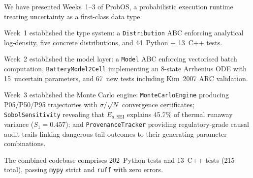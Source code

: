 \documentclass[12pt,a4paper]{article}
\theoremstyle{plain}
\theoremstyle{definition}
\theoremstyle{remark}
\begin{document}
We have presented Weeks~1--3 of ProbOS, a probabilistic execution
runtime treating uncertainty as a first-class data type.

Week~1 established the type system: a \texttt{Distribution} ABC
enforcing analytical log-density, five concrete distributions, and
44~Python + 13~C++ tests.

Week~2 established the model layer: a \texttt{Model} ABC enforcing
vectorised batch computation, \texttt{BatteryModel2Cell} implementing
an 8-state Arrhenius ODE with 15~uncertain parameters, and 67~new tests
including Kim~2007 ARC validation.

Week~3 established the Monte Carlo engine: \texttt{MonteCarloEngine}
producing P05/P50/P95 trajectories with $\sigma/\sqrt{N}$ convergence
certificates; \texttt{SobolSensitivity} revealing that $E_{a,\text{SEI}}$
explains 45.7\% of thermal runaway variance ($S_1 = 0.457$);
and \texttt{ProvenanceTracker} providing regulatory-grade causal
audit trails linking dangerous tail outcomes to their generating
parameter combinations.

The combined codebase comprises 202~Python tests and 13~C++ tests (215 total),
passing \texttt{mypy} strict and \texttt{ruff} with zero errors.



\end{document}
